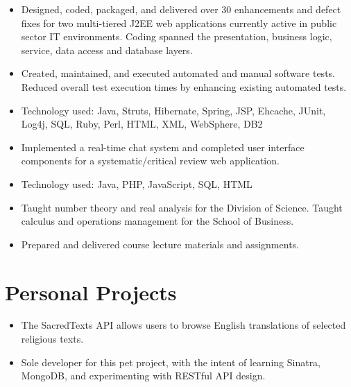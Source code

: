 \documentclass[11pt,letterpaper,sans]{moderncv}   %
\begin{document}
{\begin{itemize}%
\item Designed, coded, packaged, and delivered over 30 enhancements
and defect fixes for two multi-tiered J2EE web applications currently active in
public sector IT environments.
Coding spanned the presentation, business logic, service, data access and
database layers.
\item Created, maintained, and executed automated and manual software tests.
Reduced overall test execution times by enhancing existing automated tests.
\item Technology used: Java, Struts, Hibernate, Spring, JSP, Ehcache, JUnit,
Log4j, SQL, Ruby, Perl, HTML, XML, WebSphere, DB2
\end{itemize}}
\vspace{11pt}

{\begin{itemize}%
  \item Implemented a real-time chat system and completed user interface
  components for a systematic/critical review web application.
  \item Technology used: Java, PHP, JavaScript, SQL, HTML
\end{itemize}}
\vspace{11pt}

{\begin{itemize}%
  \item Taught number theory and real analysis for the Division of Science.
  Taught calculus and operations management for the School of Business.
  \item Prepared and delivered course lecture materials and assignments.
\end{itemize}}

\section{Personal Projects}
{\begin{itemize}%
\item The SacredTexts API allows users to browse English translations of selected religious texts.
\item Sole developer for this pet project, with the intent of learning Sinatra,
	MongoDB, and experimenting with RESTful API design.
\end{itemize}}
\vspace{11pt}
\end{document}
